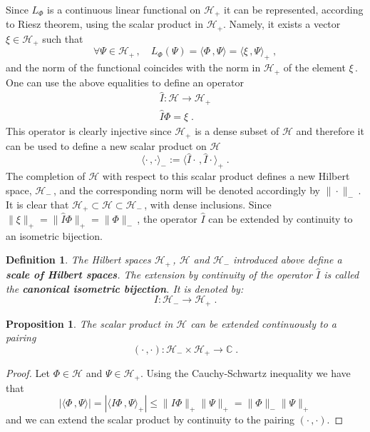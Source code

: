 \documentclass[a4paper,12pt]{amsart}
\newcommand{\scalar}[2]{\langle#1\,,#2\rangle}
\newcommand{\pair}[2]{(#1\,,#2)}
\newcommand{\norm}[1]{\|#1\|}
\renewcommand{\H}{\mathcal{H}}
\newcommand{\1}{\mathbb{I}}
\newtheorem{proposition}[theorem]{Proposition}
\newtheorem{definition}[theorem]{Definition}
\numberwithin{equation}{section}
\numberwithin{theorem}{section}
\begin{document}
Since $L_\Phi$ is a continuous linear functional on $\H_+$ it can be represented, according to Riesz theorem,
using the scalar product in $\H_+$. Namely, it exists  a vector $\xi\in\H_+$ such that
%
\begin{equation}
\forall\Psi\in\H_+\,,\quad L_{\Phi}(\Psi)=\scalar{\Phi}{\Psi}=\scalar{\xi}{\Psi}_+\;,
\end{equation}
%
and the norm of the functional coincides with the norm in $\H_+$ of the element $\xi$\,. 
One can use the above equalities to define an operator
%
\begin{equation}
\begin{array}{c}
\hat{I}\colon \H\to\H_+\\
\hat{I}\Phi=\xi\;.
\end{array}
\end{equation}
%
This operator is clearly injective since $\H_+$ is a dense subset of $\H$ and therefore it can be used to define a new scalar product on $\H$
%
\begin{equation}
\scalar{\cdot}{\cdot}_-:=\scalar{\hat{I}\cdot}{\hat{I}\cdot}_+\;.
\end{equation}
%
The completion of $\H$ with respect to this scalar product defines a new Hilbert space, $\H_-$\,, and the corresponding norm will be
denoted accordingly by $\norm{\cdot}_-$\,. It is clear that $\H_+\subset\H\subset \H_-$\,, with dense inclusions.
Since $\norm{\xi}_+=\norm{\hat{I}\Phi}_+=\norm{\Phi}_-$\,, the operator $\hat{I}$ can be extended by continuity to an isometric bijection.


\begin{definition}\label{def:scales}
The Hilbert spaces $\H_+$\,, $\H$ and $\H_-$ introduced above define a \textbf{scale of Hilbert spaces}. The extension by continuity of the
operator $\hat{I}$ is called the \textbf{canonical isometric bijection}. It is denoted by:
\begin{equation}
I\colon \H_-\to\H_+\;.
\end{equation}
\end{definition}


\begin{proposition}\label{proppairing}
The scalar product in $\H$ can be extended continuously to a pairing
\begin{equation}
\pair{\cdot}{\cdot}\colon\H_-\times\H_+\to\mathbb{C}\;.
\end{equation}
\end{proposition}

\begin{proof}
Let $\Phi\in\H$ and $\Psi\in\H_+$. Using the Cauchy-Schwartz inequality we have that
\begin{equation}\label{CSpairing}
|\scalar{\Phi}{\Psi}|=|\scalar{I\Phi}{\Psi}_+|\leq \norm{I\Phi}_+\norm{\Psi}_+=\norm{\Phi}_-\norm{\Psi}_+
\end{equation}
and we can extend the scalar product by continuity to the pairing $\pair{\cdot}{\cdot}$.
\end{proof}
\end{document}
